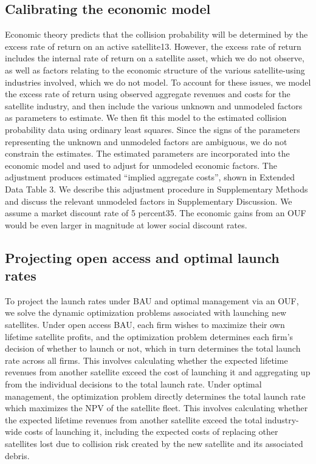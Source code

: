\documentclass[9pt,twocolumn,twoside,lineno]{pnas-new}
\begin{document}
{	\subsection*{Calibrating the economic model} Economic theory predicts that the collision probability will be determined by the excess rate of return on an active satellite13. However, the excess rate of return includes the internal rate of return on a satellite asset, which we do not observe, as well as factors relating to the economic structure of the various satellite-using industries involved, which we do not model. To account for these issues, we model the excess rate of return using observed aggregate revenues and costs for the satellite industry, and then include the various unknown and unmodeled factors as parameters to estimate. We then fit this model to the estimated collision probability data using ordinary least squares. Since the signs of the parameters representing the unknown and unmodeled factors are ambiguous, we do not constrain the estimates. The estimated parameters are incorporated into the economic model and used to adjust for unmodeled economic factors. The adjustment produces estimated “implied aggregate costs”, shown in Extended Data Table 3. We describe this adjustment procedure in Supplementary Methods and discuss the relevant unmodeled factors in Supplementary Discussion. We assume a market discount rate of 5 percent35. The economic gains from an OUF would be even larger in magnitude at lower social discount rates.
	
	\subsection*{Projecting open access and optimal launch rates} To project the launch rates under BAU and optimal management via an OUF, we solve the dynamic optimization problems associated with launching new satellites.  Under open access BAU, each firm wishes to maximize their own lifetime satellite profits, and the optimization problem determines each firm’s decision of whether to launch or not, which in turn determines the total launch rate across all firms. This involves calculating whether the expected lifetime revenues from another satellite exceed the cost of launching it and aggregating up from the individual decisions to the total launch rate. Under optimal management, the optimization problem directly determines the total launch rate which maximizes the NPV of the satellite fleet. This involves calculating whether the expected lifetime revenues from another satellite exceed the total industry-wide costs of launching it, including the expected costs of replacing other satellites lost due to collision risk created by the new satellite and its associated debris.
	
}
\end{document}
